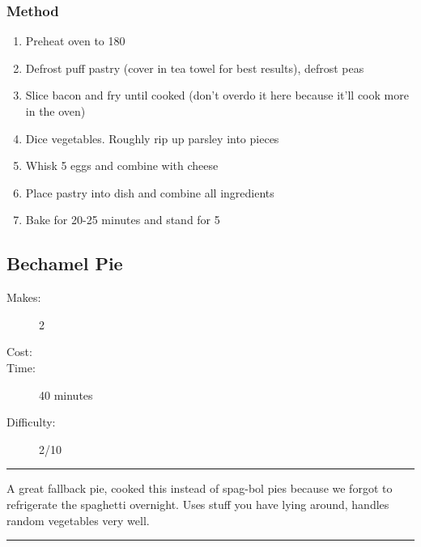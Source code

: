 \documentclass[]{article}
\begin{document}
\subsubsection*{\Large Method}
\begin{enumerate}[font=\huge\color{accent}]
	\item Preheat oven to 180
	\item Defrost puff pastry (cover in tea towel for best results), defrost peas
	\item Slice bacon and fry until cooked (don't overdo it here because it'll cook more in the oven)
	\item Dice vegetables. Roughly rip up parsley into pieces
	\item Whisk 5 eggs and combine with cheese
	\item Place pastry into dish and combine all ingredients
	\item Bake for 20-25 minutes and stand for 5
\end{enumerate}
\newpage
{}\label{rec:Bechamel Pie}
\subsection*{\center\huge Bechamel Pie}
\begin{description}
\item[Makes:] 2 
\item[Cost:] \textdollar
\item[Time:] 40 minutes
\item[Difficulty:] 2/10
\end{description}
\vspace{0.2cm}\hrule\vspace{0.5cm}
\begin{adjustwidth}{0.5 cm}{0.5 cm}

A great fallback pie, cooked this instead of spag-bol pies because we forgot to refrigerate the spaghetti overnight. Uses stuff you have lying around, handles random vegetables very well. \hfill{}\color{black}

\end{adjustwidth}
\vspace{0.5cm}\hrule
\end{document}
